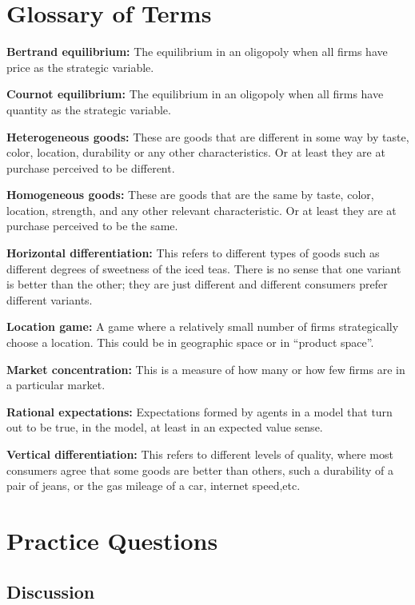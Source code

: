 \documentclass[
]{book}
\begin{document}
\hypertarget{glossary-of-terms-9}{%
\section{Glossary of Terms}\label{glossary-of-terms-9}}

\textbf{Bertrand equilibrium:} The equilibrium in an oligopoly when all firms have price as the strategic variable.

\textbf{Cournot equilibrium:} The equilibrium in an oligopoly when all firms have quantity as the strategic variable.

\textbf{Heterogeneous goods:} These are goods that are different in some way by taste, color, location, durability or any other characteristics. Or at least they are at purchase perceived to be different.

\textbf{Homogeneous goods:} These are goods that are the same by taste, color, location, strength, and any other relevant characteristic. Or at least they are at purchase perceived to be the same.

\textbf{Horizontal differentiation:} This refers to different types of goods such as different degrees of sweetness of the iced teas. There is no sense that one variant is better than the other; they are just different and different consumers prefer different variants.

\textbf{Location game:} A game where a relatively small number of firms strategically choose a location. This could be in geographic space or in ``product space''.

\textbf{Market concentration:} This is a measure of how many or how few firms are in a particular market.

\textbf{Rational expectations:} Expectations formed by agents in a model that turn out to be true, in the model, at least in an expected value sense.

\textbf{Vertical differentiation:} This refers to different levels of quality, where most consumers agree that some goods are better than others, such a durability of a pair of jeans, or the gas mileage of a car, internet speed,etc.

\hypertarget{practice-questions-9}{%
\section{Practice Questions}\label{practice-questions-9}}

\hypertarget{discussion-9}{%
\subsection{Discussion}\label{discussion-9}}
\end{document}
